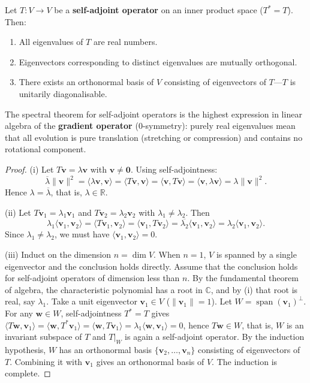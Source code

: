 \begin{theorem}\label{thm:spectral_theorem_selfadjoint}
Let $T: V \to V$ be a \textbf{self-adjoint operator} on an inner product space ($T^* = T$). Then:
\begin{enumerate}[label=(\roman*)]
    \item All eigenvalues of $T$ are real numbers.
    \item Eigenvectors corresponding to distinct eigenvalues are mutually orthogonal.
    \item There exists an orthonormal basis of $V$ consisting of eigenvectors of $T$---$T$ is unitarily diagonalisable.
\end{enumerate}
The spectral theorem for self-adjoint operators is the highest expression in linear algebra of the \textbf{gradient operator} ($0$-symmetry): purely real eigenvalues mean that all evolution is pure translation (stretching or compression) and contains no rotational component.
\end{theorem}

\begin{proof}
(i) Let $T\mathbf{v} = \lambda \mathbf{v}$ with $\mathbf{v} \neq \mathbf{0}$. Using self-adjointness:
\[
\overline{\lambda} \|\mathbf{v}\|^2 = \langle \lambda \mathbf{v}, \mathbf{v} \rangle = \langle T\mathbf{v}, \mathbf{v} \rangle = \langle \mathbf{v}, T\mathbf{v} \rangle = \langle \mathbf{v}, \lambda \mathbf{v} \rangle = \lambda \|\mathbf{v}\|^2.
\]
Hence $\lambda = \overline{\lambda}$, that is, $\lambda \in \mathbb{R}$.

(ii) Let $T\mathbf{v}_1 = \lambda_1 \mathbf{v}_1$ and $T\mathbf{v}_2 = \lambda_2 \mathbf{v}_2$ with $\lambda_1 \neq \lambda_2$. Then
\[
\lambda_1 \langle \mathbf{v}_1, \mathbf{v}_2 \rangle = \langle T\mathbf{v}_1, \mathbf{v}_2 \rangle = \langle \mathbf{v}_1, T\mathbf{v}_2 \rangle = \overline{\lambda_2} \langle \mathbf{v}_1, \mathbf{v}_2 \rangle = \lambda_2 \langle \mathbf{v}_1, \mathbf{v}_2 \rangle.
\]
Since $\lambda_1 \neq \lambda_2$, we must have $\langle \mathbf{v}_1, \mathbf{v}_2 \rangle = 0$.

(iii) Induct on the dimension $n = \dim V$. When $n=1$, $V$ is spanned by a single eigenvector and the conclusion holds directly. Assume that the conclusion holds for self-adjoint operators of dimension less than $n$. By the fundamental theorem of algebra, the characteristic polynomial has a root in $\mathbb{C}$, and by (i) that root is real, say $\lambda_1$. Take a unit eigenvector $\mathbf{v}_1 \in V$ ($\|\mathbf{v}_1\| = 1$). Let $W = \operatorname{span}(\mathbf{v}_1)^\perp$. For any $\mathbf{w} \in W$, self-adjointness $T^* = T$ gives $\langle T\mathbf{w}, \mathbf{v}_1 \rangle = \langle \mathbf{w}, T^*\mathbf{v}_1 \rangle = \langle \mathbf{w}, T\mathbf{v}_1 \rangle = \lambda_1 \langle \mathbf{w}, \mathbf{v}_1 \rangle = 0$, hence $T\mathbf{w} \in W$, that is, $W$ is an invariant subspace of $T$ and $T|_W$ is again a self-adjoint operator. By the induction hypothesis, $W$ has an orthonormal basis $\{\mathbf{v}_2, \dots, \mathbf{v}_n\}$ consisting of eigenvectors of $T$. Combining it with $\mathbf{v}_1$ gives an orthonormal basis of $V$. The induction is complete.
\end{proof}

